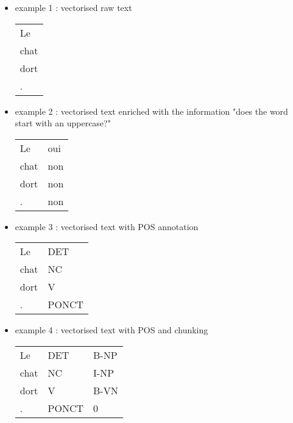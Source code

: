 \documentclass[manual-fr.tex]{subfiles}
\begin{document}
\begin{itemize}
	\item[] example 1 : vectorised raw text\\
	\begin{tabular}{l}Le \\ chat \\ dort \\ .\end{tabular}
	\item[] example 2 : vectorised text enriched with the information "does the word start with an uppercase?"\\
	\begin{tabular}{ll}Le & oui \\ chat & non \\ dort & non \\ . & non\end{tabular}
	\item[] example 3 : vectorised text with POS annotation\\
	\begin{tabular}{ll}Le & DET \\ chat & NC \\ dort & V \\ . & PONCT\end{tabular}
	\item[] example 4 : vectorised text with POS and chunking\\
	\begin{tabular}{lll}Le & DET & B-NP\\ chat & NC & I-NP\\ dort & V & B-VN\\ . & PONCT & 0\end{tabular}
\end{itemize}
\end{document}

